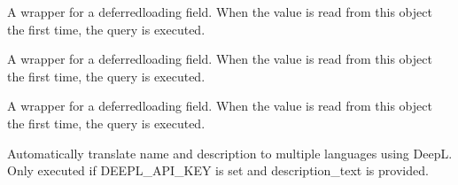 \documentclass[letterpaper,10pt,english]{sphinxmanual}
\begin{document}
\begin{fulllineitems}
\begin{fulllineitems}
\end{fulllineitems}


\begin{fulllineitems}
\label{\detokenize{index:bookings.models.MobileHome.worker_price_1p}}
\pysigstartsignatures
\pysigline
{}
\pysigstopsignatures
\sphinxAtStartPar
A wrapper for a deferred\sphinxhyphen{}loading field. When the value is read from this
object the first time, the query is executed.

\end{fulllineitems}


\begin{fulllineitems}
\label{\detokenize{index:bookings.models.MobileHome.worker_price_2p}}
\pysigstartsignatures
\pysigline
{}
\pysigstopsignatures
\sphinxAtStartPar
A wrapper for a deferred\sphinxhyphen{}loading field. When the value is read from this
object the first time, the query is executed.

\end{fulllineitems}


\begin{fulllineitems}
\label{\detokenize{index:bookings.models.MobileHome.worker_price_3p}}
\pysigstartsignatures
\pysigline
{}
\pysigstopsignatures
\sphinxAtStartPar
A wrapper for a deferred\sphinxhyphen{}loading field. When the value is read from this
object the first time, the query is executed.

\end{fulllineitems}


\begin{fulllineitems}
\label{\detokenize{index:bookings.models.MobileHome.save}}
\pysigstartsignatures
\pysiglinewithargsret
{}
{\sphinxparamcomma {}}
{}
\pysigstopsignatures
\sphinxAtStartPar
Automatically translate name and description to multiple languages using DeepL.
Only executed if DEEPL\_API\_KEY is set and description\_text is provided.


\end{fulllineitems}
\end{fulllineitems}
\end{document}
